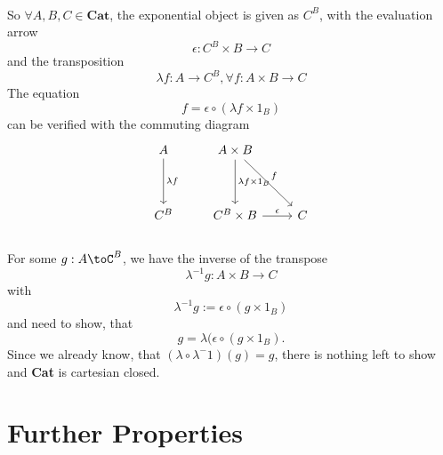   \\
  So $\forall A,B,C \in \textbf{Cat}$, the exponential object is given as $C^B$, with the evaluation arrow
  $$\epsilon: C^B \times B \to C $$ and the transposition
  $$\lambda f: A \to C^B,\forall f:A \times B \to C$$
  The equation
  $$f = \epsilon \circ (\lambda f \times 1_B)$$ can be verified with the commuting diagram
  \[
  \begin{tikzcd}[row sep=huge]
    A \arrow{d}{\lambda f} & A \times B \arrow{d}{\lambda f \times 1_B} \arrow{dr}{f} \\
    C^B                    & C^B \times B \arrow{r}{\epsilon} & C 
  \end{tikzcd}
  \]
  \\
  For some $g:A\toC^B$, we have the inverse of the transpose
  $$\lambda^{-1}g: A\times B \to C$$ with
  $$\lambda^{-1}g:=\epsilon \circ (g\times 1_B)$$
  and need to show, that
  $$g = \lambda(\epsilon \circ (g\times 1_B).$$
  Since we already know, that $(\lambda \circ \lambda^-1) (g) = g$, there is nothing left to show and \textbf{Cat} is cartesian closed. 
 
\section{Further Properties}

